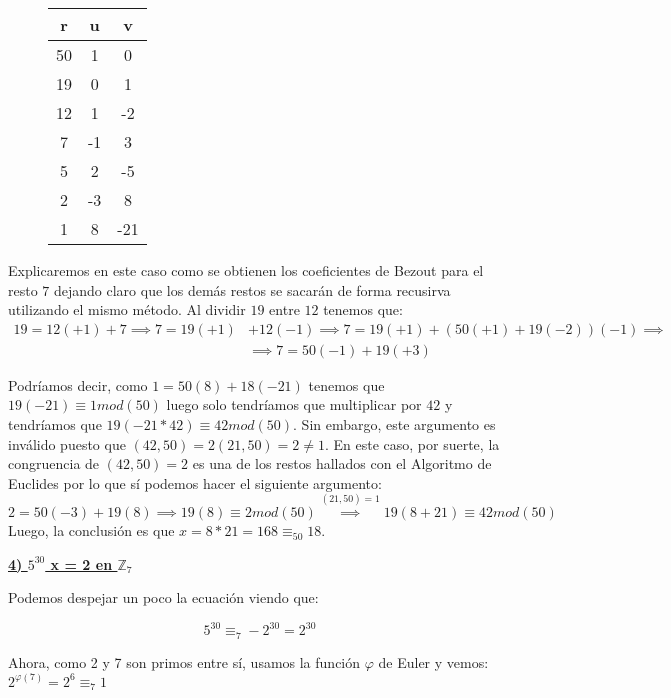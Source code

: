 \documentclass[11pt, a4paper, titlepage]{article}
\providecommand{\ent}{\mathbb{Z}}
\theoremstyle{theorem-style}
\theoremstyle{definition-style}
\theoremstyle{remark-style}
\theoremstyle{example-style}
\begin{document}
\begin{figure}[H]
\label{my-label}
\begin{center}
\begin{tabular}{|c|c|c|}
\hline
\textbf{r} & \textbf{u} & \textbf{v} \\ \hline
50         & 1          & 0          \\ \hline
19         & 0          & 1          \\ \hline
12         & 1         & -2          \\ \hline
7          & -1         & 3          \\ \hline
5          & 2          & -5         \\ \hline
2          & -3         & 8          \\ \hline
1          & 8          & -21        \\ \hline
\end{tabular}
\end{center}
\end{figure}
Explicaremos en este caso como se obtienen los coeficientes de Bezout para el resto $7$ dejando claro que los demás restos se sacarán de forma recusirva utilizando el mismo método. Al dividir $19$ entre $12$ tenemos que:
\begin{align*}
19=12(+1)+7 \implies 7=19(+1)&+12(-1) \implies 7=19(+1)+(50(+1)+19(-2))(-1)\implies \\
&\implies 7=50(-1)+19(+3)
\end{align*}

Podríamos decir, como $1=50(8)+18(-21)$ tenemos que $19(-21)\equiv1 mod(50)$ luego solo tendríamos que multiplicar por $42$ y tendríamos que $19(-21*42)\equiv42 mod(50)$. Sin embargo, este argumento es inválido puesto que $(42,50)=2(21,50)=2\ne1$. 
En este caso, por suerte, la congruencia de $(42,50)=2$ es una de los restos hallados con el Algoritmo de Euclides por lo que sí podemos hacer el siguiente argumento:
\[
2=50(-3)+19(8) \implies 19(8)\equiv 2 mod(50) \stackrel{(21,50)=1}{\implies} 19(8+21)\equiv 42 mod(50)
\]
Luego, la conclusión es que $x=8*21=168\equiv_{50} 18$.

\underline{\textbf{4) $5^{30}$ x = 2 en $\ent_7$ }}

Podemos despejar un poco la ecuación viendo que:

\[
5^{30} \equiv_7 -2^{30} = 2^{30}
\]

Ahora, como 2 y 7 son primos entre sí, usamos la función $\varphi $ de Euler y vemos: $2^{\varphi(7)} = 2^6 \equiv_7 1$
\end{document}
